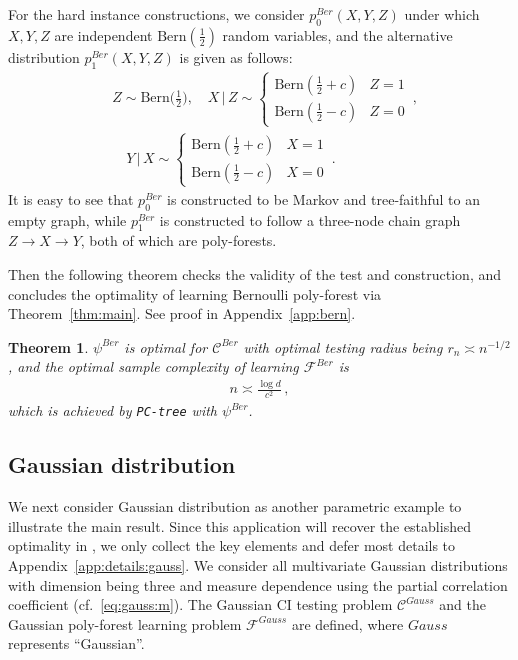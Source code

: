 \documentclass{article}
\newtheorem{theorem}{Theorem}[section]
\theoremstyle{definition}
\theoremstyle{definition}
\theoremstyle{definition}
\theoremstyle{definition}
\theoremstyle{definition}
\theoremstyle{definition}
\theoremstyle{remark}
\theoremstyle{remark}
\newcommand{\given}{\,|\,}
\newcommand{\dd}{d}
\newcommand{\ciclass}{\mathcal{C}}
\newcommand{\pfclass}{\mathcal{F}}
\begin{document}
For the hard instance constructions, we consider $p_0^{Ber}(X,Y,Z)$ under which $X,Y,Z$ are independent $\text{Bern}(\frac{1}{2})$ random variables, and the alternative distribution $p^{Ber}_1(X,Y,Z)$ is given as follows:
\begin{align*}
    & Z\sim \text{Bern}\Big(\frac{1}{2}\Big), \quad  
    X\given Z \sim\begin{cases}
        \text{Bern}(\frac{1}{2}+c) & Z=1 \\
        \text{Bern}(\frac{1}{2}-c) & Z=0
    \end{cases}\,, \\
    & \quad 
    Y\given X \sim\begin{cases}
        \text{Bern}(\frac{1}{2}+c) & X=1 \\
        \text{Bern}(\frac{1}{2}-c) & X=0
    \end{cases} \,.
\end{align*}
It is easy to see that $p_0^{Ber}$ is constructed to be Markov and tree-faithful to an empty graph, while $p_1^{Ber}$ is constructed to follow a three-node chain graph $Z\to X\to Y$, both of which are poly-forests.

Then the following theorem checks the validity of the test and construction, and concludes the optimality of learning Bernoulli poly-forest via Theorem~\ref{thm:main}. See proof in Appendix~\ref{app:bern}.
\begin{theorem}\label{thm:param:bern}
    $\psi^{Ber}$ is optimal for $\ciclass^{Ber}$ with optimal testing radius being $r_n\asymp n^{-1/2}$, and the optimal sample complexity of learning $\pfclass^{Ber}$ is
    \begin{align*}
        n \asymp \frac{\log\dd}{c^2} \,,
    \end{align*}
    which is achieved by \texttt{PC-tree} with $\psi^{Ber}$.
\end{theorem}


\subsection{Gaussian distribution}\label{sec:param:gauss}
We next consider Gaussian distribution as another parametric example to illustrate the main result. 
Since this application will recover the established optimality in \citet{wang2024optimal}, we only collect the key elements and defer most details to Appendix~\ref{app:details:gauss}.
We consider all multivariate Gaussian distributions with dimension being three and measure dependence using the partial correlation coefficient (cf.~\eqref{eq:gauss:m}).
The Gaussian CI testing problem $\ciclass^{Gauss}$ and the Gaussian poly-forest learning problem $\pfclass^{Gauss}$ are defined, where $Gauss$ represents ``Gaussian''. 
\end{document}
